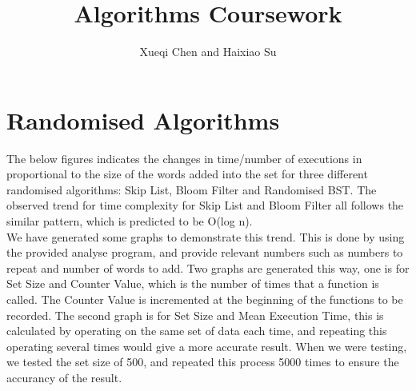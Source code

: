 \documentclass[11pt]{article}
\begin{document}
\title{Algorithms Coursework}
\author{Xueqi Chen and Haixiao Su}

\maketitle
\section{Randomised Algorithms}
The below figures indicates the changes in time/number of executions in proportional to the size of the words added into the set for three different randomised algorithms: Skip List, Bloom Filter and Randomised BST. The observed trend for time complexity for Skip List and Bloom Filter all follows the similar pattern, which is predicted to be O(log n). \\
We have generated some graphs to demonstrate this trend. This is done by using the provided analyse program, and provide relevant numbers such as numbers to repeat and number of words to add. Two graphs are generated this way, one is for Set Size and Counter Value, which is the number of times that a function is called. The Counter Value is incremented at the beginning of the functions to be recorded. The second graph is for Set Size and Mean Execution Time, this is calculated by operating on the same set of data each time, and repeating this operating several times would give a more accurate result. When we were testing, we tested the set size of 500, and repeated this process 5000 times to ensure the accurancy of the result.
\end{document}
